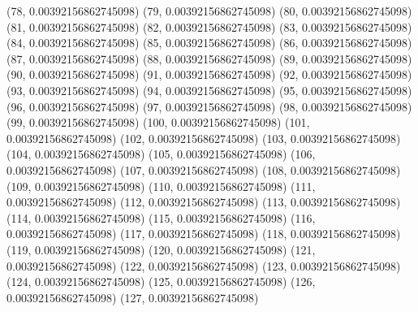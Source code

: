 \documentclass[12pt]{article}
\begin{document}
{        (78, 0.00392156862745098)
        (79, 0.00392156862745098)
        (80, 0.00392156862745098)
        (81, 0.00392156862745098)
        (82, 0.00392156862745098)
        (83, 0.00392156862745098)
        (84, 0.00392156862745098)
        (85, 0.00392156862745098)
        (86, 0.00392156862745098)
        (87, 0.00392156862745098)
        (88, 0.00392156862745098)
        (89, 0.00392156862745098)
        (90, 0.00392156862745098)
        (91, 0.00392156862745098)
        (92, 0.00392156862745098)
        (93, 0.00392156862745098)
        (94, 0.00392156862745098)
        (95, 0.00392156862745098)
        (96, 0.00392156862745098)
        (97, 0.00392156862745098)
        (98, 0.00392156862745098)
        (99, 0.00392156862745098)
        (100, 0.00392156862745098)
        (101, 0.00392156862745098)
        (102, 0.00392156862745098)
        (103, 0.00392156862745098)
        (104, 0.00392156862745098)
        (105, 0.00392156862745098)
        (106, 0.00392156862745098)
        (107, 0.00392156862745098)
        (108, 0.00392156862745098)
        (109, 0.00392156862745098)
        (110, 0.00392156862745098)
        (111, 0.00392156862745098)
        (112, 0.00392156862745098)
        (113, 0.00392156862745098)
        (114, 0.00392156862745098)
        (115, 0.00392156862745098)
        (116, 0.00392156862745098)
        (117, 0.00392156862745098)
        (118, 0.00392156862745098)
        (119, 0.00392156862745098)
        (120, 0.00392156862745098)
        (121, 0.00392156862745098)
        (122, 0.00392156862745098)
        (123, 0.00392156862745098)
        (124, 0.00392156862745098)
        (125, 0.00392156862745098)
        (126, 0.00392156862745098)
        (127, 0.00392156862745098)
    }
\end{document}
